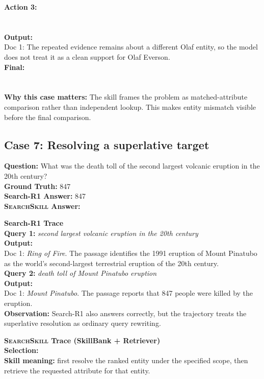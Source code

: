 \documentclass{article}
\newcommand{\Ours}{\textsc{SearchSkill}\xspace}
\begin{document}
\textbf{Action 3:}\\
\\
\\
\textbf{Output:}\\
Doc 1: The repeated evidence remains about a different Olaf entity, so the model does not treat it as a clean support for Olaf Everson.\\
\textbf{Final:}\\
\\
\\
\textbf{Why this case matters:} The skill frames the problem as matched-attribute comparison rather than independent lookup. This makes entity mismatch visible before the final comparison.
\casehr

\subsection{Case 7: Resolving a superlative target}
\casehr
\small
\noindent\textbf{Question:} What was the death toll of the second largest volcanic eruption in the 20th century?\\
\textbf{Ground Truth:} 847\\
\textbf{Search-R1 Answer:} 847\\
\textbf{\Ours Answer:} 

\casedash
\noindent\textcolor{red!75!black}{\textbf{Search-R1 Trace}}\\
\textbf{Query 1:} \emph{second largest volcanic eruption in the 20th century}\\
\textbf{Output:}\\
Doc 1: \emph{Ring of Fire}. The passage identifies the 1991 eruption of Mount Pinatubo as the world's second-largest terrestrial eruption of the 20th century.\\
\textbf{Query 2:} \emph{death toll of Mount Pinatubo eruption}\\
\textbf{Output:}\\
Doc 1: \emph{Mount Pinatubo}. The passage reports that 847 people were killed by the eruption.\\
\textbf{Observation:} Search-R1 also answers correctly, but the trajectory treats the superlative resolution as ordinary query rewriting.

\casedash
\noindent\textcolor{blue!75!black}{\textbf{\Ours Trace (SkillBank + Retriever)}}\\
\textbf{Selection:} \\
\textbf{Skill meaning:} first resolve the ranked entity under the specified scope, then retrieve the requested attribute for that entity.
\end{document}
